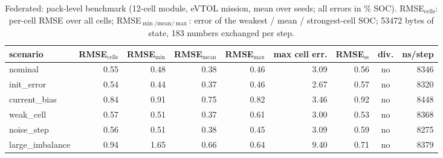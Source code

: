\begin{table}[H]\centering\footnotesize\setlength{\tabcolsep}{4pt}\caption{Federated: pack-level benchmark (12-cell module, eVTOL mission, mean over seeds; all errors in \% SOC). RMSE$_\mathrm{cells}$: per-cell RMSE over all cells; RMSE$_{\min/\mathrm{mean}/\max}$: error of the weakest / mean / strongest-cell SOC; 53472 bytes of state, 183 numbers exchanged per step.}\label{tab:pack_Federated}
\begin{tabular}{lrrrrrrcr}\toprule scenario & RMSE$_\mathrm{cells}$ & RMSE$_{\min}$ & RMSE$_\mathrm{mean}$ & RMSE$_{\max}$ & max cell err. & RMSE$_\mathrm{ss}$ & div. & ns/step \\ \midrule
nominal & 0.55 & 0.48 & 0.38 & 0.46 & 3.09 & 0.56 & no & 8346 \\
init\_error & 0.54 & 0.44 & 0.37 & 0.46 & 2.67 & 0.57 & no & 8320 \\
current\_bias & 0.84 & 0.91 & 0.75 & 0.82 & 3.46 & 0.92 & no & 8448 \\
weak\_cell & 0.57 & 0.51 & 0.37 & 0.61 & 3.00 & 0.53 & no & 8368 \\
noise\_step & 0.56 & 0.51 & 0.38 & 0.45 & 3.09 & 0.59 & no & 8275 \\
large\_imbalance & 0.94 & 1.65 & 0.66 & 0.64 & 9.40 & 0.71 & no & 8379 \\
\bottomrule\end{tabular}\end{table}
